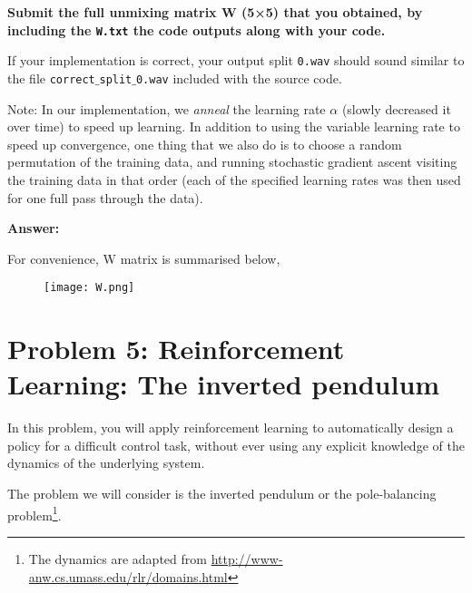 \documentclass{article}
\begin{document}
\begin{enumerate}[label=(\alph*)]
\textbf{Submit the full unmixing matrix W (5×5) that you obtained, by including the \texttt{W.txt} the code outputs along with your code.}

If your implementation is correct, your output split \texttt{0.wav} should sound similar to the file \texttt{correct}$\_$\texttt{split}$\_$\texttt{0.wav} included with the source code.

Note: In our implementation, we \textit{anneal} the learning rate $\alpha$ (slowly decreased it over time) to speed up learning. In addition to using the variable learning rate to speed up convergence, one thing that we also do is to choose a random permutation of the training data, and running stochastic gradient ascent visiting the training data in that order (each of the specified learning rates was then used for one full pass through the data).

\textbf{Answer:}

For convenience, W matrix is summarised below,

\begin{figure}[H]
    \centering
    \texttt{[image: W.png]}
    \label{fig:W}
\end{figure}


\end{enumerate}






\section*{Problem 5: Reinforcement Learning: The inverted pendulum}


In this problem, you will apply reinforcement learning to automatically design a policy for a difficult control task, without ever using any explicit knowledge of the dynamics of the underlying system.

The problem we will consider is the inverted pendulum or the pole-balancing problem\footnote{The dynamics are adapted from \url{http://www-anw.cs.umass.edu/rlr/domains.html}}.
\end{document}
